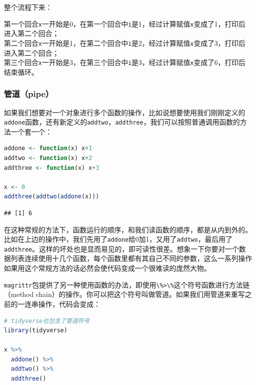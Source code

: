 \documentclass[]{ctexbook}
\newcommand{\passthrough}[1]{#1}
\begin{document}
整个流程下来：

第一个回合\passthrough{\lstinline!x!}一开始是0，在第一个回合中\passthrough{\lstinline!i!}是1，经过计算赋值\passthrough{\lstinline!x!}变成了1，打印后进入第二个回合；\\
第二个回合\passthrough{\lstinline!x!}一开始是1，在第二个回合中\passthrough{\lstinline!i!}是2，经过计算赋值\passthrough{\lstinline!x!}变成了3，打印后进入第二个回合；\\
第三个回合\passthrough{\lstinline!x!}一开始是3，在第三个回合中\passthrough{\lstinline!i!}是3，经过计算赋值\passthrough{\lstinline!x!}变成了6，打印后结束循环。

\hypertarget{ux7ba1ux9053pipe}{%
\subsubsection{管道（pipe）}\label{ux7ba1ux9053pipe}}

如果我们想要对一个对象进行多个函数的操作，比如说想要使用我们刚刚定义的\passthrough{\lstinline!addone!}函数，还有新定义的\passthrough{\lstinline!addtwo!}，\passthrough{\lstinline!addthree!}，我们可以按照普通调用函数的方法一个套一个：

\begin{lstlisting}[language=R]
addone <- function(x) x+1
addtwo <- function(x) x+2
addthree <- function(x) x+3

x <- 0
addthree(addtwo(addone(x)))
\end{lstlisting}

\begin{lstlisting}
## [1] 6
\end{lstlisting}

在这种常规的方法下，函数运行的顺序，和我们读函数的顺序，都是从内到外的。比如在上边的操作中，我们先用了\passthrough{\lstinline!addone!}给0加1，又用了\passthrough{\lstinline!addtwo!}，最后用了\passthrough{\lstinline!addthree!}。这样的坏处也是显而易见的，即可读性很差。想象一下你要对一个数据列表连续使用十几个函数，每个函数里都有其自己不同的参数，这么一系列操作如果用这个常规方法的话必然会使代码变成一个很难读的庞然大物。

\passthrough{\lstinline!magrittr!}包提供了另一种使用函数的办法，即使用\passthrough{\lstinline!\%>\%!}这个符号函数进行方法链（method chain）的操作。你可以把这个符号叫做管道。如果我们用管道来重写之前的一连串操作，代码会变成：

\begin{lstlisting}[language=R]
# tidyverse也包含了管道符号
library(tidyverse)

x %>% 
  addone() %>% 
  addtwo() %>% 
  addthree()
\end{lstlisting}
\end{document}
